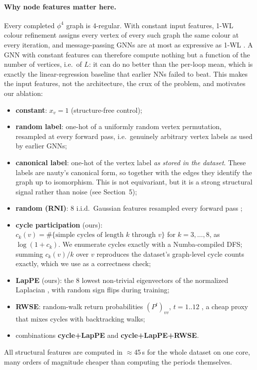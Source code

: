 \documentclass[11pt]{article}
\begin{document}
\paragraph{Why node features matter here.} Every completed $\phi^4$ graph is 4-regular. With
constant input features, 1-WL colour refinement assigns every vertex of every such graph the same
colour at every iteration, and message-passing GNNs are at most as expressive as 1-WL
\citep{xu2019gin}. A GNN with constant features can therefore compute nothing but a function of
the number of vertices, i.e.\ of $L$: it can do no better than the per-loop mean, which is exactly
the linear-regression baseline that earlier NNs failed to beat. This makes the input features,
not the architecture, the crux of the problem, and motivates our ablation:
\begin{itemize}\setlength\itemsep{0em}
\item \textbf{constant}: $x_v=1$ (structure-free control);
\item \textbf{random label}: one-hot of a uniformly random vertex permutation, resampled at every
forward pass, i.e.\ genuinely arbitrary vertex labels as used by earlier GNNs;
\item \textbf{canonical label}: one-hot of the vertex label \emph{as stored in the dataset}. These
labels are nauty's canonical form, so together with the edges they identify the graph up to
isomorphism. This is not equivariant, but it is a strong structural signal rather than noise (see
Section~5);
\item \textbf{random (RNI)}: 8 i.i.d.\ Gaussian features resampled every forward pass
\citep{sato2021rni,abboud2021rni};
\item \textbf{cycle participation} (ours): $c_k(v)=\#\{\text{simple cycles of length }k\text{ through }v\}$
for $k=3,\dots,8$, as $\log(1+c_k)$. We enumerate cycles exactly with a Numba-compiled DFS; summing
$c_k(v)/k$ over $v$ reproduces the dataset's graph-level cycle counts exactly, which we use as a
correctness check;
\item \textbf{LapPE} (ours): the 8 lowest non-trivial eigenvectors of the normalized Laplacian
\citep{dwivedi2023benchmarking}, with random sign flips during training;
\item \textbf{RWSE}: random-walk return probabilities $(P^t)_{vv}$, $t=1..12$
\citep{dwivedi2022rwse}, a cheap proxy that mixes cycles with backtracking walks;
\item combinations \textbf{cycle+LapPE} and \textbf{cycle+LapPE+RWSE}.
\end{itemize}
All structural features are computed in $\approx$45\,s for the whole dataset on one core, many
orders of magnitude cheaper than computing the periods themselves.
\end{document}
